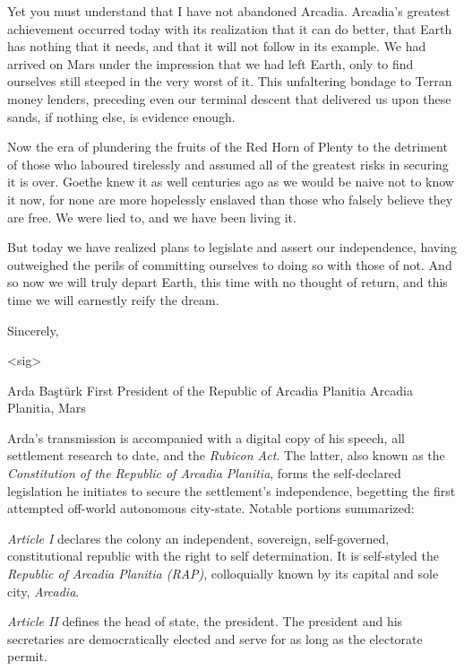 Yet you must understand that I have not abandoned Arcadia. Arcadia's greatest achievement occurred today with its realization that it can do better, that Earth has nothing that it needs, and that it will not follow in its example. We had arrived on Mars under the impression that we had left Earth, only to find ourselves still steeped in the very worst of it. This unfaltering bondage to Terran money lenders, preceding even our terminal descent that delivered us upon these sands, if nothing else, is evidence enough.

Now the era of plundering the fruits of the Red Horn of Plenty to the detriment of those who laboured tirelessly and assumed all of the greatest risks in securing it is over. Goethe knew it as well centuries ago as we would be naive not to know it now, for none are more hopelessly enslaved than those who falsely believe they are free. We were lied to, and we have been living it. 

But today we have realized plans to legislate and assert our independence, having outweighed the perils of committing ourselves to doing so with those of not. And so now we will truly depart Earth, this time with no thought of return, and this time we will earnestly reify the dream.

Sincerely,

<sig>

Arda Baştürk
First President of the Republic of Arcadia Planitia
Arcadia Planitia, Mars
\stopTimelineDocument

Arda's transmission is accompanied with a digital copy of his speech, all settlement research to date, and the {\it Rubicon Act}. The latter, also known as the {\it Constitution of the Republic of Arcadia Planitia}, forms the self-declared legislation he initiates to secure the settlement's independence, begetting the first attempted off-world autonomous city-state. Notable portions summarized:

\startTimelineDocument
\startitemize[5]
\setupwhitespace[big]
\item {\it Article I} declares the colony an independent, sovereign, self-governed, constitutional republic with the right to self determination. It is self-styled the {\it Republic of Arcadia Planitia (RAP)}, colloquially known by its capital and sole city, {\it Arcadia}.

\item {\it Article II} defines the head of state, the president. The president and his secretaries are democratically elected and serve for as long as the electorate permit.

